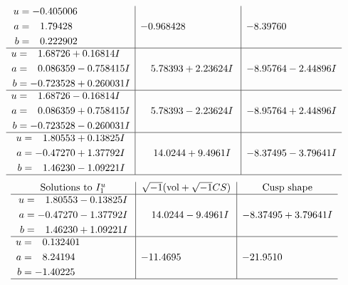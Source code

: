 \documentclass[1p]{elsarticle_modified}
\theoremstyle{definition}
\newcommand{\I}{\sqrt{-1}}
\begin{document}
$$\begin{array}{c|c|c}
\begin{aligned}
u &= -0.405006\phantom{ +0.000000I} \\
a &= \phantom{-}1.79428\phantom{ +0.000000I} \\
b &= \phantom{-}0.222902\phantom{ +0.000000I}\end{aligned}
 & -0.968428\phantom{ +0.000000I} & -8.39760\phantom{ +0.000000I} \\ \hline\begin{aligned}
u &= \phantom{-}1.68726 + 0.16814 I \\
a &= \phantom{-}0.086359 - 0.758415 I \\
b &= -0.723528 + 0.260031 I\end{aligned}
 & \phantom{-}5.78393 + 2.23624 I & -8.95764 - 2.44896 I \\ \hline\begin{aligned}
u &= \phantom{-}1.68726 - 0.16814 I \\
a &= \phantom{-}0.086359 + 0.758415 I \\
b &= -0.723528 - 0.260031 I\end{aligned}
 & \phantom{-}5.78393 - 2.23624 I & -8.95764 + 2.44896 I \\ \hline\begin{aligned}
u &= \phantom{-}1.80553 + 0.13825 I \\
a &= -0.47270 + 1.37792 I \\
b &= \phantom{-}1.46230 - 1.09221 I\end{aligned}
 & \phantom{-}14.0244 + 9.4961 I & -8.37495 - 3.79641 I\\
 \hline 
 \end{array}$$\newpage$$\begin{array}{c|c|c}  
\text{Solutions to }I^u_{1}& \I (\text{vol} + \sqrt{-1}CS) & \text{Cusp shape}\\
 \hline 
\begin{aligned}
u &= \phantom{-}1.80553 - 0.13825 I \\
a &= -0.47270 - 1.37792 I \\
b &= \phantom{-}1.46230 + 1.09221 I\end{aligned}
 & \phantom{-}14.0244 - 9.4961 I & -8.37495 + 3.79641 I \\ \hline\begin{aligned}
u &= \phantom{-}0.132401\phantom{ +0.000000I} \\
a &= \phantom{-}8.24194\phantom{ +0.000000I} \\
b &= -1.40225\phantom{ +0.000000I}\end{aligned}
 & -11.4695\phantom{ +0.000000I} & -21.9510\phantom{ +0.000000I}\\
 \hline 
 \end{array}$$\newpage\newpage\renewcommand{\arraystretch}{1}
\end{document}

